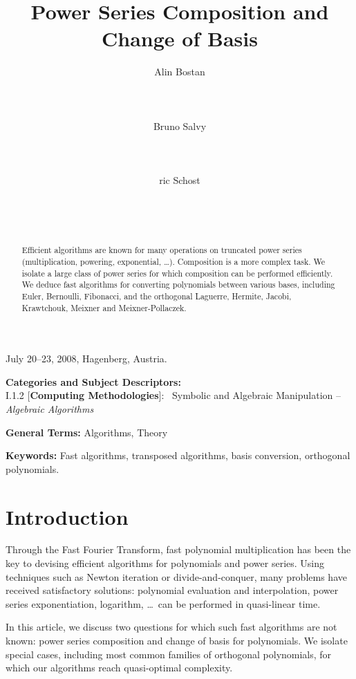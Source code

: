 \documentclass{sig-alternate}
\title{Power Series Composition and Change of Basis}
\author{
\alignauthor Alin Bostan\\
\affaddr{Algorithms Project}\\
\affaddr{INRIA Rocquencourt}\\ 
\affaddr{France}\\
\affaddr{Alin.Bostan@inria.fr} 
\alignauthor Bruno Salvy\\
\affaddr{Algorithms Project}\\
\affaddr{INRIA Rocquencourt}\\ 
\affaddr{France}\\
\affaddr{Bruno.Salvy@inria.fr} 
\alignauthor {\'E}ric Schost\\
\affaddr{ORCCA and CSD}\\
\affaddr{University of Western Ontario}\\
\affaddr{London, ON, Canada}\\
\affaddr{eschost@uwo.ca} 
}
\begin{document}
 {July 20--23, 2008, Hagenberg, Austria.}  

\maketitle
\begin{abstract}
Efficient algorithms are known for many operations on truncated power
series (multiplication, powering, exponential, \dots). Composition is
a more complex task. We isolate a large class of power series for
which composition can be performed efficiently. We deduce fast
algorithms for converting polynomials between various bases, including
Euler, Bernoulli, Fibonacci, and the orthogonal Laguerre, Hermite,
Jacobi, Krawtchouk, Meixner and Meixner-Pollaczek.
\end{abstract}



\vspace{1mm}
 \noindent
 {\bf Categories and Subject Descriptors:} \\
\noindent I.1.2 [{\bf Computing Methodologies}]:{~} Symbolic and Algebraic
  Manipulation -- \emph{Algebraic Algorithms}
 
 \vspace{1mm}
 \noindent
 {\bf General Terms:} Algorithms, Theory
 
 \vspace{1mm}
 \noindent
 {\bf Keywords:} Fast algorithms, transposed algorithms, basis conversion, orthogonal polynomials.




\section{Introduction}\label{sec:intro}

Through the Fast Fourier Transform, fast polynomial multiplication has
been the key to devising efficient algorithms for polynomials and
power series. Using techniques such as Newton iteration or
divide-and-conquer, many problems have received satisfactory
solutions: polynomial evaluation and interpolation, power series
exponentiation, logarithm, \dots~can be performed in quasi-linear
time.

In this article, we discuss two questions for which such fast
algorithms are not known: power series composition and change of basis
for polynomials. We isolate special cases, including most
common families of orthogonal polynomials, for which our algorithms
reach quasi-optimal complexity.
\end{document}
